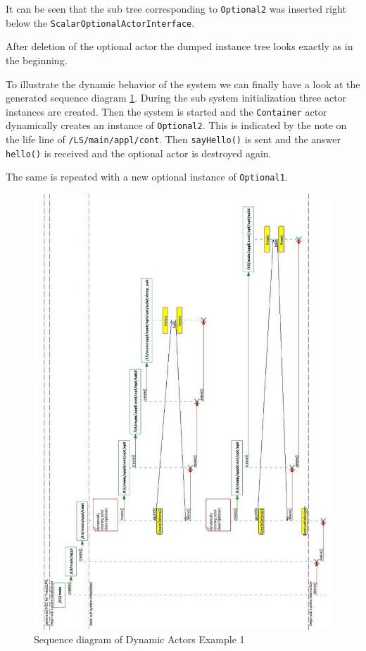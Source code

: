It can be seen that the sub tree corresponding to \texttt{Optional2} was inserted right below the
\texttt{ScalarOptionalActorInterface}.

After deletion of the optional actor the dumped instance tree looks exactly as in the beginning.

To illustrate the dynamic behavior of the system we can finally have a look at the generated
sequence diagram \ref{fig:dynact1_msc}. During the sub system initialization three actor
instances are created. Then the system is started and the \texttt{Container} actor dynamically creates
an instance of \texttt{Optional2}. This is indicated by the note on the life line of \texttt{/LS/main/appl/cont}.
Then \texttt{sayHello()} is sent and the answer \texttt{hello()} is received and the optional actor
is destroyed again.

The same is repeated with a new optional instance of \texttt{Optional1}.

\begin{figure}
\includegraphics[scale=0.45]{images/039-DynAct1-MSC.jpg}
\caption{Sequence diagram of Dynamic Actors Example 1}
\label{fig:dynact1_msc}
\end{figure}

